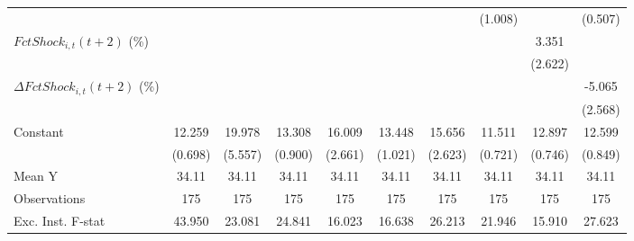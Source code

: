 {\begin{tabular}{l*{9}{c}}
                    &                     &                     &                     &                     &                     &                     &     (1.008)         &                     &     (0.507)         \\
\addlinespace
$ FctShock_{i,t}(t+2)$ (\%)&                     &                     &                     &                     &                     &                     &                     &       3.351         &                     \\
                    &                     &                     &                     &                     &                     &                     &                     &     (2.622)         &                     \\
\addlinespace
$ \Delta FctShock_{i,t}(t+2)$ (\%)&                     &                     &                     &                     &                     &                     &                     &                     &      -5.065\sym{*}  \\
                    &                     &                     &                     &                     &                     &                     &                     &                     &     (2.568)         \\
\addlinespace
Constant            &      12.259\sym{***}&      19.978\sym{***}&      13.308\sym{***}&      16.009\sym{***}&      13.448\sym{***}&      15.656\sym{***}&      11.511\sym{***}&      12.897\sym{***}&      12.599\sym{***}\\
                    &     (0.698)         &     (5.557)         &     (0.900)         &     (2.661)         &     (1.021)         &     (2.623)         &     (0.721)         &     (0.746)         &     (0.849)         \\
\midrule
Mean Y              &       34.11         &       34.11         &       34.11         &       34.11         &       34.11         &       34.11         &       34.11         &       34.11         &       34.11         \\
Observations        &         175         &         175         &         175         &         175         &         175         &         175         &         175         &         175         &         175         \\
Exc. Inst. F-stat   &      43.950         &      23.081         &      24.841         &      16.023         &      16.638         &      26.213         &      21.946         &      15.910         &      27.623         \\
\bottomrule
\end{tabular}
}
